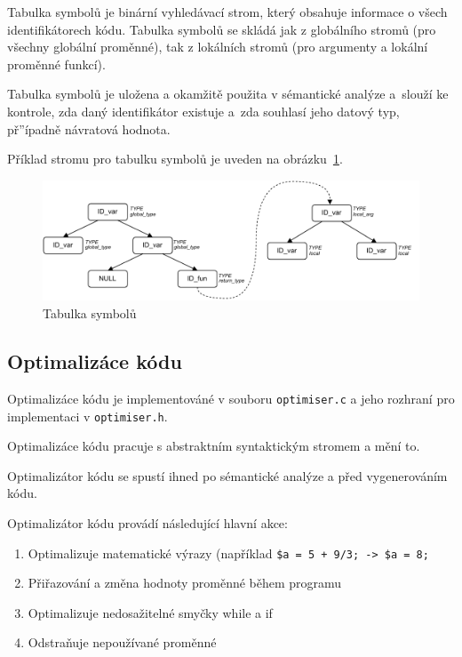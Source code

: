 \documentclass[a4paper, 11pt]{article}
\begin{document}
    Tabulka symbolů je binární vyhledávací strom, který obsahuje informace o všech identifikátorech kódu. Tabulka symbolů se skládá jak z globálního stromů (pro všechny globální proměnné), tak z lokálních stromů (pro argumenty a lokální proměnné funkcí).


    Tabulka symbolů je uložena a okamžitě použita v sémantické analýze a~slouží ke kontrole, zda daný identifikátor existuje a~zda souhlasí jeho datový typ, př''ípadně návratová hodnota.


	Příklad stromu pro tabulku symbolů je uveden na obrázku~\ref{figure:sem_anal_example}.

	\begin{figure}[!ht]
		\centering
		\includegraphics[width=1\linewidth]{sem_anal.pdf}
		\caption{Tabulka symbolů}
		\label{figure:sem_anal_example}
	\end{figure}

    \subsection{Optimalizáce kódu}
    Optimalizáce kódu je implementováné v souboru \texttt{optimiser.c} a jeho rozhraní pro implementaci v \texttt{optimiser.h}.

    Optimalizáce kódu pracuje s abstraktním syntaktickým stromem a mění to.

    Optimalizátor kódu se spustí ihned po sémantické analýze a před vygenerováním kódu.

    Optimalizátor kódu provádí následující hlavní akce:
    \begin{enumerate}
        \item Optimalizuje matematické výrazy (například \texttt{\$a = 5 + 9/3; -> \$a = 8;}
        \item Přiřazování a změna hodnoty proměnné během programu
        \item Optimalizuje nedosažitelné smyčky while a if
        \item Odstraňuje nepoužívané proměnné
    \end{enumerate}
\end{document}
